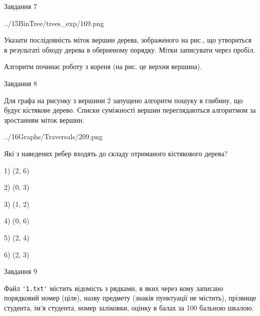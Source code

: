 \documentclass[12pt, ukrainian]{article}
\def\code#1{\Verb!#1!}
\begin{document}
{\vspace{10mm}\par

\newpage
\begin{minipage}[t]{9.7cm}
               
{\begin{center}Завдання {7}\end{center}}
\vspace{-4mm}

\begin{center}
	{../15BinTree/trees_exp/169.png}
\end{center}
Указати послідовність міток вершин дерева, зображеного на рис., що утвориться в результаті обходу дерева в оберненому порядку. Мітки записувати через пробіл.\par Алгоритм починає роботу з кореня (на рис. це верхня вершина).\par

\end{minipage}
\vline \hspace{8mm}
\begin{minipage}[t]{8.0cm}
               
{\begin{center}Завдання {8}\end{center}}
\vspace{-4mm}
Для графа на рисунку з вершини 2 запущено алгоритм пошуку в глибину, що будує кістякове дерево. Списки суміжності вершин переглядаються алгоритмом за зростанням міток вершин.\par
\begin{center}
	{../16Graphs/Traversals/209.png}
\end{center}
\par Які з наведених ребер входять до складу отриманого кістякового дерева?\par
1) (2, 6)\par
2) (0, 3)\par
3) (1, 2)\par
4) (0, 6)\par
5) (2, 4)\par
6) (2, 3)\par
{\vskip 15pt} \par

\end{minipage}

               
{\begin{center}Завдання {9}\end{center}}
\vspace{-4mm}
Файл \code{'1.txt'} містить відомість з рядками, в яких через кому записано поряд\-ковий номер (ціле), назву предмету (знаків пунктуації не містить), прізвище студента, ім'я студента, номер заліковки, оцінку в балах за 100 бальною шкалою.

}
\end{document}
